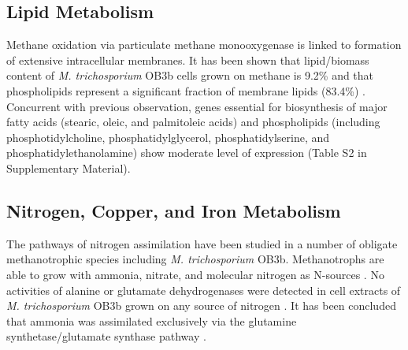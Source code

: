 \subsection{Lipid Metabolism}
Methane oxidation via particulate methane monooxygenase is linked to formation of extensive intracellular membranes.
It has been shown that lipid/biomass content of \textit{M. trichosporium} OB3b cells grown on methane is 9.2\% and that phospholipids represent a significant fraction of membrane lipids (83.4\%) \cite{weaver1975, guckert1991}.
Concurrent with previous observation, genes essential for biosynthesis of major fatty acids (stearic, oleic, and palmitoleic acids) and phospholipids (including phosphotidylcholine, phosphatidylglycerol, phosphatidylserine, and phosphatidylethanolamine) show moderate level of expression (Table S2 in Supplementary Material).

\subsection{Nitrogen, Copper, and Iron Metabolism}
The pathways of nitrogen assimilation have been studied in a number of obligate methanotrophic species including \textit{M. trichosporium} OB3b.
Methanotrophs are able to grow with ammonia, nitrate, and molecular nitrogen as N-sources \cite{whittenbury1970, shishkina1979, murrell1983a, murrell1983b, chu1998, kim2001}.
No activities of alanine or glutamate dehydrogenases were detected in cell extracts of \textit{M. trichosporium} OB3b grown on any source of nitrogen \cite{shishkina1979, murrell1983a, murrell1983b}.
It has been concluded that ammonia was assimilated exclusively via the glutamine synthetase/glutamate synthase pathway \cite{murrell1983b}.

